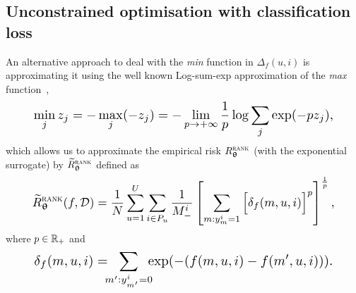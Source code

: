 %

%




\subsection{Unconstrained optimisation with classification loss}

An alternative approach to deal with the \emph{min} function in $\Delta_f(u, i)$ 
is approximating it using the well known Log-sum-exp approximation 
of the \emph{max} function~\cite[p. 72]{boyd2004convex},
\begin{equation}
\label{eq:minappox}
\resizebox{.88\columnwidth}{!}{$
  \displaystyle \min_j z_j 
= \displaystyle -\max_j (-z_j) 
= \displaystyle -\lim_{p \to +\infty} \frac{1}{p} \log \sum_j \exp(-p z_j),
$}
\end{equation}
which allows us to approximate the empirical risk $R_{{\bm{\uptheta}}}^{\textsc{rank}}$ (with the exponential surrogate)
by $\widetilde R_{{\bm{\uptheta}}}^{\textsc{rank}}$ defined as
\begin{equation}
\label{eq:rankapprox}
\resizebox{.888\columnwidth}{!}{$
\begin{aligned}
\widetilde R_{\upthetabm}^{\textsc{rank}}(f, \DCal)
= \frac{1}{N} \sum_{u=1}^U \sum_{i \in P_u} \frac{1}{M_-^i} \left[
  \sum_{m: y_m^i = 1} \Big[ \delta_f(m, u, i) \Big]^p \right]^\frac{1}{p},
\end{aligned}
$}
\end{equation}
where $p \in \mathbb{R}_+$ and
$$
\resizebox{.88\columnwidth}{!}{$
\displaystyle
\delta_f(m, u, i) = \!\!\! \sum_{m': y_{m'}^i = 0} \!\!\! \exp(-(f(m, u, i) - f(m', u, i))).
$}
$$


